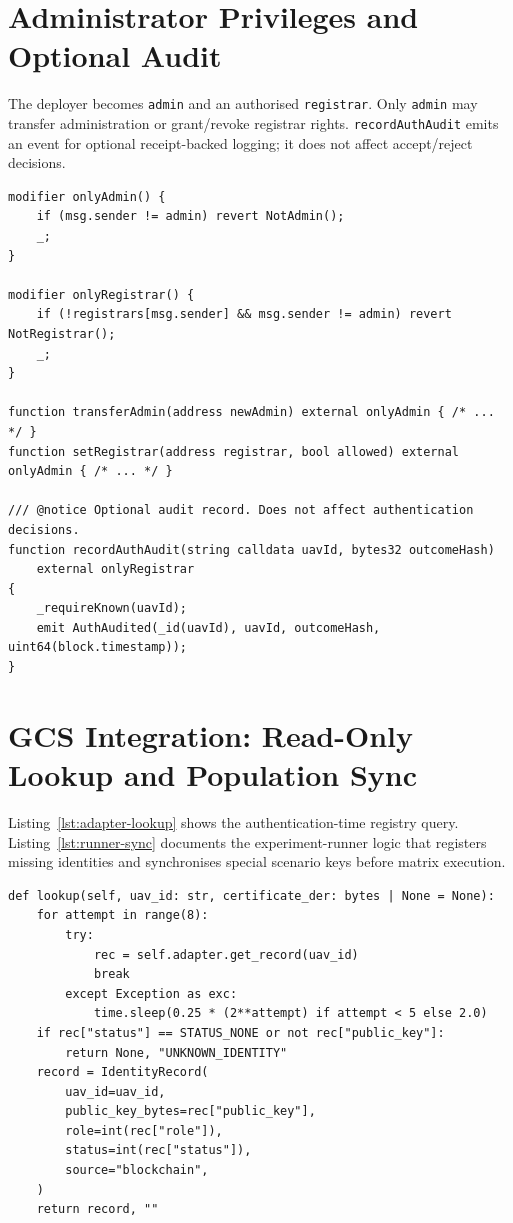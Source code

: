 \section{Administrator Privileges and Optional Audit}
\label{app:contract-admin}

The deployer becomes \texttt{admin} and an authorised \texttt{registrar}. Only \texttt{admin} may transfer administration or grant/revoke registrar rights. \texttt{recordAuthAudit} emits an event for optional receipt-backed logging; it does not affect accept/reject decisions.

\begin{lstlisting}[style=solidity,caption={Access control and audit (lines 48--78, 154--158)},label=lst:registry-admin]
modifier onlyAdmin() {
    if (msg.sender != admin) revert NotAdmin();
    _;
}

modifier onlyRegistrar() {
    if (!registrars[msg.sender] && msg.sender != admin) revert NotRegistrar();
    _;
}

function transferAdmin(address newAdmin) external onlyAdmin { /* ... */ }
function setRegistrar(address registrar, bool allowed) external onlyAdmin { /* ... */ }

/// @notice Optional audit record. Does not affect authentication decisions.
function recordAuthAudit(string calldata uavId, bytes32 outcomeHash)
    external onlyRegistrar
{
    _requireKnown(uavId);
    emit AuthAudited(_id(uavId), uavId, outcomeHash, uint64(block.timestamp));
}
\end{lstlisting}

\section{GCS Integration: Read-Only Lookup and Population Sync}
\label{app:contract-integration}

Listing~\ref{lst:adapter-lookup} shows the authentication-time registry query. Listing~\ref{lst:runner-sync} documents the experiment-runner logic that registers missing identities and synchronises special scenario keys before matrix execution.

\begin{lstlisting}[style=python,caption={Blockchain identity lookup with RPC retry (\texttt{adapter.py})},label=lst:adapter-lookup]
def lookup(self, uav_id: str, certificate_der: bytes | None = None):
    for attempt in range(8):
        try:
            rec = self.adapter.get_record(uav_id)
            break
        except Exception as exc:
            time.sleep(0.25 * (2**attempt) if attempt < 5 else 2.0)
    if rec["status"] == STATUS_NONE or not rec["public_key"]:
        return None, "UNKNOWN_IDENTITY"
    record = IdentityRecord(
        uav_id=uav_id,
        public_key_bytes=rec["public_key"],
        role=int(rec["role"]),
        status=int(rec["status"]),
        source="blockchain",
    )
    return record, ""
\end{lstlisting}


